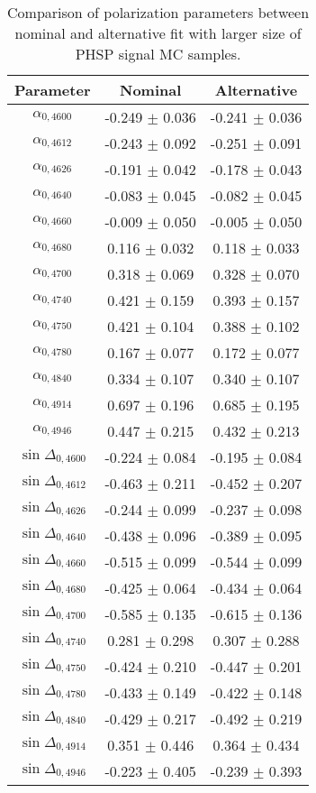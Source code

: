 \begin{table}[H]
    \centering 
    \caption{Comparison of polarization parameters between nominal and alternative fit with larger size of PHSP signal MC samples.}
    \label{tab:mc_stat_comp_1}
\begin{tabular}{c|c|c}
\hline\hline
Parameter & Nominal & Alternative \\\hline
$\alpha_{0,4600}$ & -0.249 $\pm$ 0.036 & -0.241 $\pm$ 0.036 \\
$\alpha_{0,4612}$ & -0.243 $\pm$ 0.092 & -0.251 $\pm$ 0.091 \\
$\alpha_{0,4626}$ & -0.191 $\pm$ 0.042 & -0.178 $\pm$ 0.043 \\
$\alpha_{0,4640}$ & -0.083 $\pm$ 0.045 & -0.082 $\pm$ 0.045 \\
$\alpha_{0,4660}$ & -0.009 $\pm$ 0.050 & -0.005 $\pm$ 0.050 \\
$\alpha_{0,4680}$ & 0.116 $\pm$ 0.032 & 0.118 $\pm$ 0.033 \\
$\alpha_{0,4700}$ & 0.318 $\pm$ 0.069 & 0.328 $\pm$ 0.070 \\
$\alpha_{0,4740}$ & 0.421 $\pm$ 0.159 & 0.393 $\pm$ 0.157 \\
$\alpha_{0,4750}$ & 0.421 $\pm$ 0.104 & 0.388 $\pm$ 0.102 \\
$\alpha_{0,4780}$ & 0.167 $\pm$ 0.077 & 0.172 $\pm$ 0.077 \\
$\alpha_{0,4840}$ & 0.334 $\pm$ 0.107 & 0.340 $\pm$ 0.107 \\
$\alpha_{0,4914}$ & 0.697 $\pm$ 0.196 & 0.685 $\pm$ 0.195 \\
$\alpha_{0,4946}$ & 0.447 $\pm$ 0.215 & 0.432 $\pm$ 0.213 \\
$\sin\Delta_{0,4600}$ & -0.224 $\pm$ 0.084 & -0.195 $\pm$ 0.084 \\
$\sin\Delta_{0,4612}$ & -0.463 $\pm$ 0.211 & -0.452 $\pm$ 0.207 \\
$\sin\Delta_{0,4626}$ & -0.244 $\pm$ 0.099 & -0.237 $\pm$ 0.098 \\
$\sin\Delta_{0,4640}$ & -0.438 $\pm$ 0.096 & -0.389 $\pm$ 0.095 \\
$\sin\Delta_{0,4660}$ & -0.515 $\pm$ 0.099 & -0.544 $\pm$ 0.099 \\
$\sin\Delta_{0,4680}$ & -0.425 $\pm$ 0.064 & -0.434 $\pm$ 0.064 \\
$\sin\Delta_{0,4700}$ & -0.585 $\pm$ 0.135 & -0.615 $\pm$ 0.136 \\
$\sin\Delta_{0,4740}$ & 0.281 $\pm$ 0.298 & 0.307 $\pm$ 0.288 \\
$\sin\Delta_{0,4750}$ & -0.424 $\pm$ 0.210 & -0.447 $\pm$ 0.201 \\
$\sin\Delta_{0,4780}$ & -0.433 $\pm$ 0.149 & -0.422 $\pm$ 0.148 \\
$\sin\Delta_{0,4840}$ & -0.429 $\pm$ 0.217 & -0.492 $\pm$ 0.219 \\
$\sin\Delta_{0,4914}$ & 0.351 $\pm$ 0.446 & 0.364 $\pm$ 0.434 \\
$\sin\Delta_{0,4946}$ & -0.223 $\pm$ 0.405 & -0.239 $\pm$ 0.393 \\
\hline\hline
\end{tabular}
\end{table}

